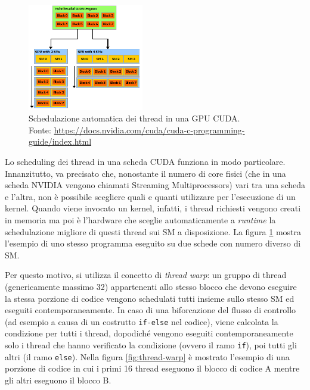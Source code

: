 \documentclass[12pt,a4paper,oneside]{book}
\begin{document}
	\begin{figure}
		\centering
		\includegraphics[width=0.45\textwidth]{automatic-scalability}
		\caption[Schedulazione automatica dei thread in una GPU CUDA]{Schedulazione automatica dei thread in una GPU CUDA.\\Fonte: \url{https://docs.nvidia.com/cuda/cuda-c-programming-guide/index.html}}
		\label{fig:automatic-scalability}
	\end{figure}
	
	Lo scheduling dei thread in una scheda CUDA funziona in modo particolare. Innanzitutto, va precisato che, nonostante il numero di core fisici (che in una scheda NVIDIA vengono chiamati Streaming Multiprocessors) vari tra una scheda e l'altra, non è possibile scegliere quali e quanti utilizzare per l'esecuzione di un kernel. Quando viene invocato un kernel, infatti, i thread richiesti vengono creati in memoria ma poi è l'hardware che sceglie automaticamente a \textit{runtime} la schedulazione migliore di questi thread sui SM a disposizione. La figura \ref{fig:automatic-scalability} mostra l'esempio di uno stesso programma eseguito su due schede con numero diverso di SM.

	Per questo motivo, si utilizza il concetto di \textit{thread warp}: un gruppo di thread (genericamente massimo 32) appartenenti allo stesso blocco che devono eseguire la stessa porzione di codice vengono schedulati tutti insieme sullo stesso SM ed eseguiti contemporaneamente. In caso di una biforcazione del flusso di controllo (ad esempio a causa di un costrutto \texttt{if-else} nel codice), viene calcolata la condizione per tutti i thread, dopodiché vengono eseguiti contemporaneamente solo i thread che hanno verificato la condizione (ovvero il ramo \texttt{if}), poi tutti gli altri (il ramo \texttt{else}). Nella figura \ref{fig:thread-warp} è mostrato l'esempio di una porzione di codice in cui i primi 16 thread eseguono il blocco di codice A mentre gli altri eseguono il blocco B.
	
\end{document}
